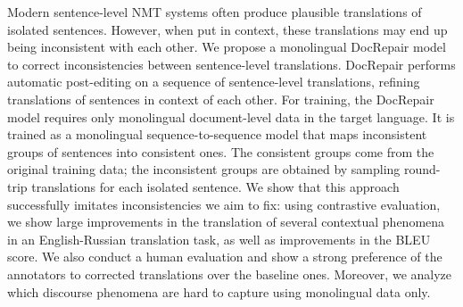 Modern sentence-level NMT systems often produce plausible translations of isolated sentences.  However, when put in context, these translations may end up being inconsistent with each other. We propose a monolingual DocRepair model to correct inconsistencies between sentence-level translations. DocRepair performs automatic post-editing on a sequence of sentence-level translations, refining translations of sentences in context of each other. For training, the DocRepair model requires only monolingual document-level data in the target language. It is trained as a monolingual sequence-to-sequence model that maps inconsistent groups of sentences into consistent ones. The consistent groups come from the original training data; the inconsistent groups are obtained by sampling round-trip translations for each isolated sentence. We show that this approach successfully imitates inconsistencies we aim to fix: using contrastive evaluation, we show large improvements in the translation of several contextual phenomena in an English-Russian translation task, as well as improvements in the BLEU score. We also conduct a human evaluation and show a strong preference of the annotators to corrected translations over the baseline ones. Moreover, we analyze which discourse phenomena are hard to capture using monolingual data only.